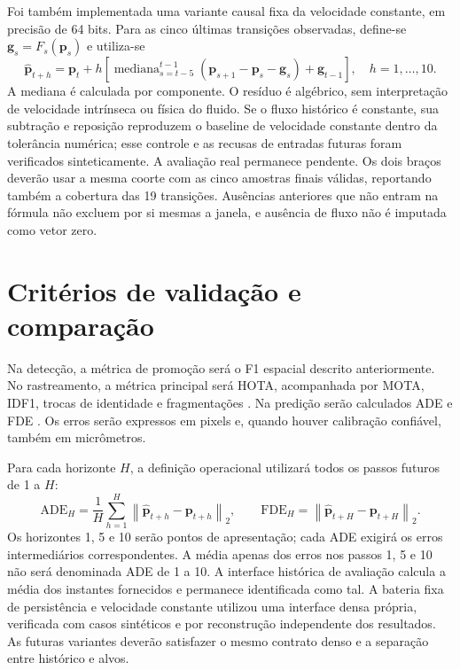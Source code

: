Foi também implementada uma variante causal fixa da velocidade constante,
em precisão de 64 bits. Para as cinco últimas transições observadas, define-se
$\mathbf g_s=F_s(\mathbf p_s)$ e utiliza-se
\begin{equation}
\widehat{\mathbf p}_{t+h}=\mathbf p_t+h\left[
\mathop{\mathrm{mediana}}_{s=t-5}^{t-1}
(\mathbf p_{s+1}-\mathbf p_s-\mathbf g_s)+\mathbf g_{t-1}\right],
\quad h=1,\ldots,10.
\end{equation}
A mediana é calculada por componente. O resíduo é algébrico, sem interpretação
de velocidade intrínseca ou física do fluido. Se o fluxo histórico é constante,
sua subtração e reposição reproduzem o baseline de velocidade constante dentro
da tolerância numérica; esse controle e as recusas de entradas futuras foram
verificados sinteticamente. A avaliação real permanece pendente. Os dois braços
deverão usar a mesma coorte com as cinco amostras finais válidas, reportando
também a cobertura das 19 transições. Ausências anteriores que não entram na
fórmula não excluem por si mesmas a janela, e ausência de fluxo não é imputada
como vetor zero.

\section{Critérios de validação e comparação}

Na detecção, a métrica de promoção será o F1 espacial descrito anteriormente. No rastreamento, a métrica principal será HOTA, acompanhada por MOTA, IDF1, trocas de identidade e fragmentações \cite{luiten2021hota}. Na predição serão calculados ADE e FDE \cite{alahi2016sociallstm}. Os erros serão expressos em pixels e, quando houver calibração confiável, também em micrômetros.

Para cada horizonte $H$, a definição operacional utilizará todos os passos futuros de 1 a $H$:
\begin{equation}
\mathrm{ADE}_{H}=\frac{1}{H}\sum_{h=1}^{H}\left\|\widehat{\mathbf p}_{t+h}-\mathbf p_{t+h}\right\|_2,
\qquad
\mathrm{FDE}_{H}=\left\|\widehat{\mathbf p}_{t+H}-\mathbf p_{t+H}\right\|_2.
\end{equation}
Os horizontes 1, 5 e 10 serão pontos de apresentação; cada ADE exigirá os erros intermediários correspondentes. A média apenas dos erros nos passos 1, 5 e 10 não será denominada ADE de 1 a 10. A interface histórica de avaliação calcula a média dos instantes fornecidos e permanece identificada como tal. A bateria fixa de persistência e velocidade constante utilizou uma interface densa própria, verificada com casos sintéticos e por reconstrução independente dos resultados. As futuras variantes deverão satisfazer o mesmo contrato denso e a separação entre histórico e alvos.

